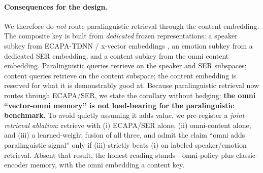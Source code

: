 \paragraph{Consequences for the design.} We therefore do \emph{not} route paralinguistic retrieval through the content embedding. The composite key is built from \emph{dedicated} frozen representations: a speaker subkey from ECAPA-TDNN / x-vector embeddings \citep{ecapatdnn2020,xvector2021}, an emotion subkey from a dedicated SER embedding, and a content subkey from the omni content embedding. Paralinguistic queries retrieve on the speaker and SER subspaces; content queries retrieve on the content subspace; the content embedding is reserved for what it is demonstrably good at. Because paralinguistic retrieval now routes through ECAPA/SER, we state the corollary without hedging: \textbf{the omni ``vector-omni memory'' is not load-bearing for the paralinguistic benchmark.} To avoid quietly assuming it adds value, we pre-register a \emph{joint-retrieval ablation}: retrieve with (i) ECAPA/SER alone, (ii) omni-content alone, and (iii) a learned-weight fusion of all three, and admit the claim ``omni adds paralinguistic signal'' only if (iii) strictly beats (i) on labeled speaker/emotion retrieval. Absent that result, the honest reading stands---omni-policy plus classic-encoder memory, with the omni embedding a content key.

